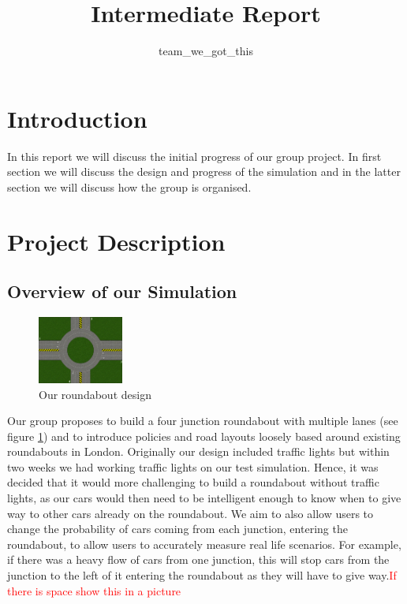 \documentclass[11pt]{article}
\title{{Intermediate Report}}
\date{}
\author{team\_we\_got\_this}
\begin{document}
	\maketitle
	\thispagestyle{fancy}
	\section{Introduction}
	In this report we will discuss the initial progress of our group project. In first section we will discuss the design and progress of the simulation and in the latter section we will discuss how the group is organised.
	
	
	\section{Project Description}
	
	\subsection{Overview of our Simulation}
	\begin{figure}
		\centering
		\includegraphics[width=0.25\textwidth]{Roundabout2}
		\caption{Our roundabout design}
		\label{Roundabout Design}
	
	\end{figure}
	Our group proposes to build a four junction roundabout with multiple lanes (see figure \ref{Roundabout Design}) and to introduce policies and road layouts loosely based around existing roundabouts in London. Originally our design included traffic lights but within two weeks we had working traffic lights on our test simulation. Hence, it was decided that it would more challenging to build a roundabout without traffic lights, as our cars would then need to be intelligent enough to know when to give way to other cars already on the roundabout. We aim to also allow users to change the probability of cars coming from each junction, entering the roundabout, to allow users to accurately measure real life scenarios. For example, if there was a heavy flow of cars from one junction, this will stop cars from the junction to the left of it entering the roundabout as they will have to give way.\textcolor{red}{If there is space show this in a picture}
	
\end{document}
